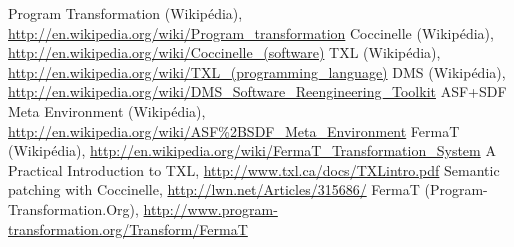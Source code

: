 \documentclass[runningheads,a4paper]{llncs}
\begin{document}
\begin{multicols}{2}
\begin{thebibliography}{9}

 Program Transformation (Wikipédia), \url{http://en.wikipedia.org/wiki/Program_transformation}
 Coccinelle (Wikipédia), \url{http://en.wikipedia.org/wiki/Coccinelle_(software)}
 TXL (Wikipédia), \url{http://en.wikipedia.org/wiki/TXL_(programming_language)}
 DMS (Wikipédia), \url{http://en.wikipedia.org/wiki/DMS_Software_Reengineering_Toolkit}
 ASF+SDF Meta Environment (Wikipédia), \url{http://en.wikipedia.org/wiki/ASF\%2BSDF_Meta_Environment}
 FermaT (Wikipédia), \url{http://en.wikipedia.org/wiki/FermaT_Transformation_System}
 A Practical Introduction to TXL, \url{http://www.txl.ca/docs/TXLintro.pdf}
 Semantic patching with Coccinelle, \url{http://lwn.net/Articles/315686/}
 FermaT (Program-Transformation.Org), \url{http://www.program-transformation.org/Transform/FermaT}


\end{thebibliography}



\end{multicols}
\end{document}
